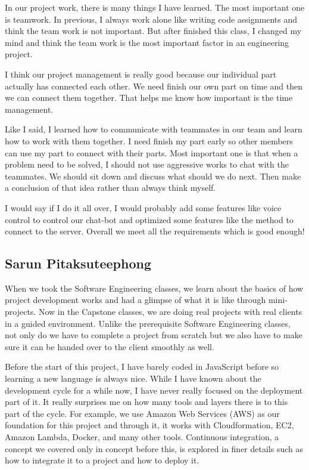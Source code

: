 \documentclass[onecolumn, draftclsnofoot,10pt, compsoc]{IEEEtran}
\begin{document}
    In our project work, there is many things I have learned. The most important one is teamwork. In previous, I always work alone like writing code assignments and think the team work is not important. But after finished this class, I changed my mind and think the team work is the most important factor in an engineering project. 
    
    I think our project management is really good because our individual part actually has connected each other. We need finish our own part on time and then we can connect them together. That helps me know how important is the time management. 
    
    Like I said, I learned how to communicate with teammates in our team and learn how to work with them together. I need finish my part early so other members can use my part to connect with their parts. Most important one is that when a problem need to be solved, I should not use aggressive works to chat with the teammates. We should sit down and discuss what should we do next. Then make a conclusion of that idea rather than always think myself.
    
    I would say if I do it all over, I would probably add some features like voice control to control our chat-bot and optimized some features like the method to connect to the server. Overall we meet all the requirements which is good enough!

\subsection{Sarun Pitaksuteephong}
    When we took the Software Engineering classes, we learn about the basics of how project development works and had a glimpse of what it is like through mini-projects.
    Now in the Capstone classes, we are doing real projects with real clients in a guided environment.
    Unlike the prerequisite Software Engineering classes, not only do we have to complete a project from scratch but we also have to make sure it can be handed over to the client smoothly as well.
    
    Before the start of this project, I have barely coded in JavaScript before so learning a new language is always nice.
    While I have known about the development cycle for a while now, I have never really focused on the deployment part of it.
    It really surprises me on how many tools and layers there is to this part of the cycle.
    For example, we use Amazon Web Services (AWS) as our foundation for this project and through it, it works with Cloudformation, EC2, Amazon Lambda, Docker, and many other tools. 
    Continuous integration, a concept we covered only in concept before this, is explored in finer details such as how to integrate it to a project and how to deploy it.
    
\end{document}
